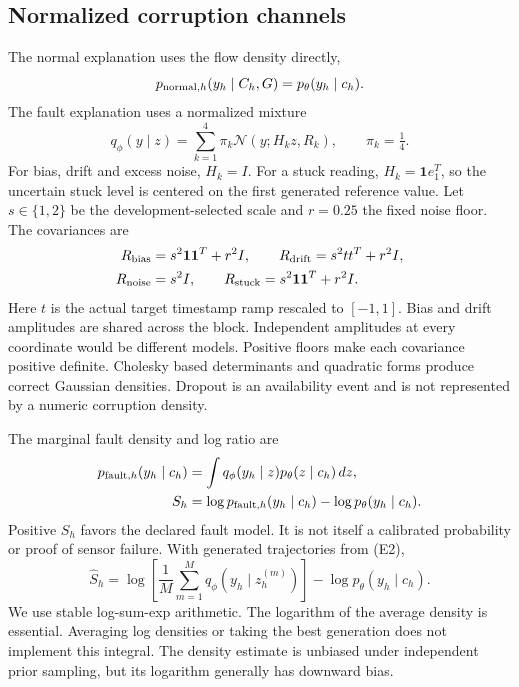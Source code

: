 \documentclass[conference]{IEEEtran}
\newcommand{\1}{\mathbf{1}}
\begin{document}
\subsection{Normalized corruption channels}
The normal explanation uses the flow density directly,
\begin{equation}
 p_{{\rm normal},h}(y_h\mid C_h,G)=p_\theta(y_h\mid c_h).
\end{equation}
The fault explanation uses a normalized mixture
\begin{equation}
 q_\phi(y\mid z)=\sum_{k=1}^{4}\pi_k\mathcal N(y;H_kz,R_k),
 \qquad \pi_k=\tfrac14.
\end{equation}
For bias, drift and excess noise, $H_k=I$. For a stuck reading, $H_k=\1 e_1^T$, so the uncertain stuck level is centered on the first generated reference value. Let $s\in\{1,2\}$ be the development-selected scale and $r=0.25$ the fixed noise floor. The covariances are
\[
\begin{split}
 R_{\rm bias}&=s^2\1\1^T+r^2I,\qquad
 R_{\rm drift}=s^2tt^T+r^2I,\\
 R_{\rm noise}&=s^2I,\qquad
 R_{\rm stuck}=s^2\1\1^T+r^2I.
\end{split}
\]
Here $t$ is the actual target timestamp ramp rescaled to $[-1,1]$. Bias and drift amplitudes are shared across the block. Independent amplitudes at every coordinate would be different models. Positive floors make each covariance positive definite. Cholesky based determinants and quadratic forms produce correct Gaussian densities. Dropout is an availability event and is not represented by a numeric corruption density.

The marginal fault density and log ratio are
\begin{align}
 p_{{\rm fault},h}(y_h\mid c_h)&=\int q_\phi(y_h\mid z)p_\theta(z\mid c_h)\,dz, \\
 S_h&=\log p_{{\rm fault},h}(y_h\mid c_h)-\log p_\theta(y_h\mid c_h).
\end{align}
Positive $S_h$ favors the declared fault model. It is not itself a calibrated probability or proof of sensor failure. With generated trajectories from (E2),
\begin{equation}
 \widehat S_h=\log\left[\frac{1}{M}\sum_{m=1}^{M}q_\phi(y_h\mid z_h^{(m)})\right]
 -\log p_\theta(y_h\mid c_h).
\end{equation}
We use stable log-sum-exp arithmetic. The logarithm of the average density is essential. Averaging log densities or taking the best generation does not implement this integral. The density estimate is unbiased under independent prior sampling, but its logarithm generally has downward bias.
\end{document}
